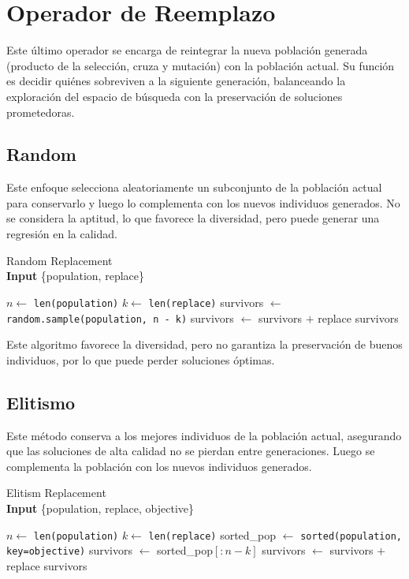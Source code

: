 \chapter{Operador de Reemplazo}

Este último operador se encarga de reintegrar la nueva población generada (producto de la selección, cruza y mutación) con la población actual. Su función es decidir quiénes sobreviven a la siguiente generación, balanceando la exploración del espacio de búsqueda con la preservación de soluciones prometedoras.

\section{Random}

Este enfoque selecciona aleatoriamente un subconjunto de la población actual para conservarlo y luego lo complementa con los nuevos individuos generados. No se considera la aptitud, lo que favorece la diversidad, pero puede generar una regresión en la calidad.

\begin{algorithm}[H]
	\caption{Random Replacement \\ \textbf{Input} \{population, replace\}}
	\begin{algorithmic}[1]
		\State $n \gets$ \texttt{len(population)}
		\State $k \gets$ \texttt{len(replace)}
		\State survivors $\gets$ \texttt{random.sample(population, n - k)}
		\State survivors $\gets$ survivors $+$ replace
		\State \Return survivors
		\EndFunction
	\end{algorithmic}
	\label{alg:replacement_random}
\end{algorithm}

Este algoritmo favorece la diversidad, pero no garantiza la preservación de buenos individuos, por lo que puede perder soluciones óptimas.

\section{Elitismo}

Este método conserva a los mejores individuos de la población actual, asegurando que las soluciones de alta calidad no se pierdan entre generaciones. Luego se complementa la población con los nuevos individuos generados.

\begin{algorithm}[H]
	\caption{Elitism Replacement \\ \textbf{Input} \{population, replace, objective\}}
	\begin{algorithmic}[1]
		\State $n \gets$ \texttt{len(population)}
		\State $k \gets$ \texttt{len(replace)}
		\State sorted\_pop $\gets$ \texttt{sorted(population, key=objective)}
		\State survivors $\gets$ sorted\_pop$[:n-k]$
		\State survivors $\gets$ survivors $+$ replace
		\State \Return survivors
		\EndFunction
	\end{algorithmic}
	\label{alg:replacement_elitism}
\end{algorithm}

